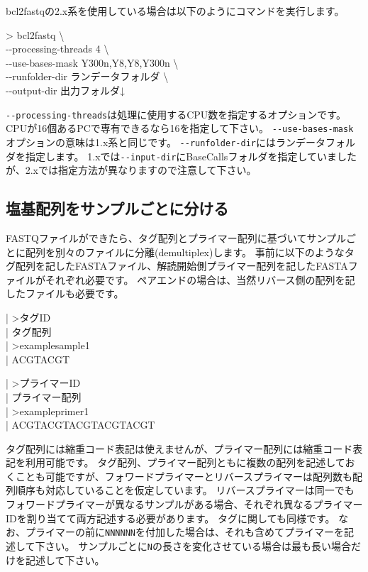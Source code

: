 \documentclass[titlepage,10pt,a4paper]{jsbook}
\newenvironment{content}{\begin{shaded}\vspace{-1em}\raggedright\ttfamily\footnotesize\setlength{\baselineskip}{1.4em}}{\end{shaded}\vspace{-1em}}
\newenvironment{cmd}{\begin{oframed}\raggedright\ttfamily\footnotesize\setlength{\baselineskip}{1.4em}}{\end{oframed}\vspace{-1em}}
\begin{document}
bcl2fastqの2.x系を使用している場合は以下のようにコマンドを実行します。
\begin{cmd}
{\textgreater} bcl2fastq {\textbackslash}\\
{-}{-}processing-threads 4 {\textbackslash}\\
{-}{-}use-bases-mask Y300n,Y8,Y8,Y300n {\textbackslash}\\
{-}{-}runfolder-dir ランデータフォルダ {\textbackslash}\\
{-}{-}output-dir 出力フォルダ↓
\end{cmd}
\texttt{{-}{-}processing-threads}は処理に使用するCPU数を指定するオプションです。
CPUが16個あるPCで専有できるなら16を指定して下さい。
\texttt{{-}{-}use-bases-mask}オプションの意味は1.x系と同じです。
\texttt{{-}{-}runfolder-dir}にはランデータフォルダを指定します。
1.xでは\texttt{{-}{-}input-dir}にBaseCallsフォルダを指定していましたが、2.xでは指定方法が異なりますので注意して下さい。

\subsection{塩基配列をサンプルごとに分ける}

FASTQファイルができたら、タグ配列とプライマー配列に基づいてサンプルごとに配列を別々のファイルに分離(demultiplex)します。
事前に以下のようなタグ配列を記したFASTAファイル、解読開始側プライマー配列を記したFASTAファイルがそれぞれ必要です。
ペアエンドの場合は、当然リバース側の配列を記したファイルも必要です。
\begin{content}
| {\textgreater}タグID\\
| タグ配列\\
| {\textgreater}examplesample1\\
| ACGTACGT
\end{content}
\begin{content}
| {\textgreater}プライマーID\\
| プライマー配列\\
| {\textgreater}exampleprimer1\\
| ACGTACGTACGTACGTACGT
\end{content}
タグ配列には縮重コード表記は使えませんが、プライマー配列には縮重コード表記を利用可能です。
タグ配列、プライマー配列ともに複数の配列を記述しておくことも可能ですが、フォワードプライマーとリバースプライマーは配列数も配列順序も対応していることを仮定しています。
リバースプライマーは同一でもフォワードプライマーが異なるサンプルがある場合、それぞれ異なるプライマーIDを割り当てて両方記述する必要があります。
タグに関しても同様です。
なお、プライマーの前に\texttt{NNNNNN}を付加した場合は、それも含めてプライマーを記述して下さい。
サンプルごとに\texttt{N}の長さを変化させている場合は最も長い場合だけを記述して下さい。
\end{document}
